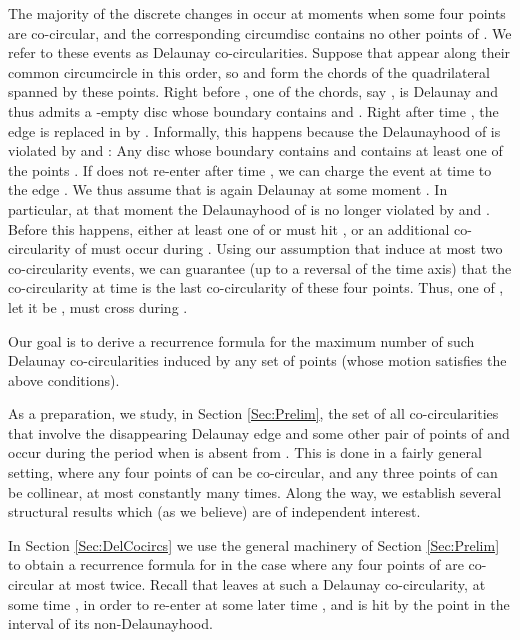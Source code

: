\documentclass[letter,11pt]{article}
\begin{document}
\smallskip
{}
The majority of the discrete changes in  occur at moments  when some four points  are co-circular, and the corresponding circumdisc contains no other points of . We refer to these events as Delaunay co-circularities. Suppose that  appear along their common circumcircle in this order, so  and  form the chords of the quadrilateral spanned by these points. Right before , one of the chords, say , is Delaunay and thus admits a -empty disc whose boundary contains  and . 
Right after time , the edge  is replaced in  by .  
Informally, this happens because the Delaunayhood of  is violated by  and : Any disc whose boundary contains  and  contains at least one of the points . 
If  does not re-enter  after time , we can charge the event at time  to the edge . We thus assume that  is again Delaunay at some moment . In particular, at that moment the Delaunayhood of  is no longer violated by  and . Before this happens, either at least one of  or  must hit , or an additional co-circularity of  must occur during . Using our assumption that  induce at most two co-circularity events, we can guarantee (up to a reversal of the time axis) that the co-circularity at time  is the last co-circularity of these four points. Thus, one of , let it be , must cross  during .

Our goal is to derive a recurrence formula for the maximum number  of such Delaunay co-circularities induced by any set  of  points (whose motion satisfies the above conditions). 

As a preparation, we study, in Section \ref{Sec:Prelim}, the set of all co-circularities that involve the disappearing Delaunay edge  and some other pair of points of  and occur during the period  when  is absent from .
This is done in a fairly general setting, where any four points of  can be co-circular, and any three points 
of  can be collinear, at most constantly many times. 
Along the way, we establish several structural results which (as we believe) are of independent interest.

In Section \ref{Sec:DelCocircs} we use the general machinery of Section \ref{Sec:Prelim} to obtain a recurrence formula for  in the case where any four points of  are co-circular at most twice.
Recall that  leaves  at such a Delaunay co-circularity, at some time , in order to re-enter  at some later time , and  is hit by the point  in the interval  of its non-Delaunayhood.
\end{document}
